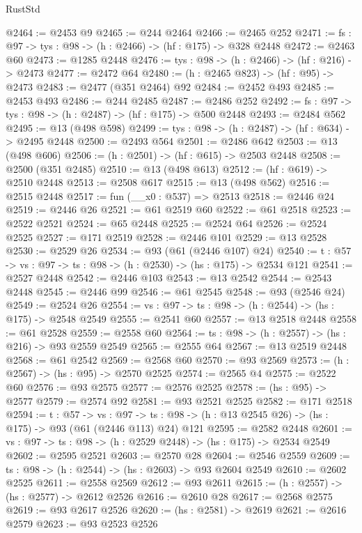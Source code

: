 \begin{lexlean}{RustStd}
\begin{coremodule}
@2464 := @2453 @9
@2465 := @244 @2464
@2466 := @2465 @252
@2471 := {fs : @97} -> {tys : @98} -> (h : @2466) -> (hf : @175) -> @328 @2448
@2472 := @2463 @60
@2473 := @1285 @2448
@2476 := {tys : @98} -> (h : @2466) -> (hf : @216) -> @2473
@2477 := @2472 @64
@2480 := (h : @2465 @823) -> (hf : @95) -> @2473
@2483 := @2477 (@351 @2464) @92
@2484 := @2452 @493
@2485 := @2453 @493
@2486 := @244 @2485
@2487 := @2486 @252
@2492 := {fs : @97} -> {tys : @98} -> (h : @2487) -> (hf : @175) -> @500 @2448
@2493 := @2484 @562
@2495 := @13 (@498 @598)
@2499 := {tys : @98} -> (h : @2487) -> (hf : @634) -> @2495 @2448
@2500 := @2493 @564
@2501 := @2486 @642
@2503 := @13 (@498 @606)
@2506 := (h : @2501) -> (hf : @615) -> @2503 @2448
@2508 := @2500 (@351 @2485)
@2510 := @13 (@498 @613)
@2512 := (hf : @619) -> @2510 @2448
@2513 := @2508 @617
@2515 := @13 (@498 @562)
@2516 := @2515 @2448
@2517 := fun (__x0 : @537) => @2513
@2518 := @2446 @24
@2519 := @2446 @26
@2521 := @61 @2519 @60
@2522 := @61 @2518
@2523 := @2522 @2521
@2524 := @65 @2448
@2525 := @2524 @64
@2526 := @2524 @2525
@2527 := @171 @2519
@2528 := @2446 @101
@2529 := @13 @2528
@2530 := @2529 @26
@2534 := @93 (@61 (@2446 @107) @24)
@2540 := {t : @57} -> {vs : @97} -> {ts : @98} -> (h : @2530) -> (hs : @175) -> @2534 @121
@2541 := @2527 @2448
@2542 := @2446 @103
@2543 := @13 @2542
@2544 := @2543 @2448
@2545 := @2446 @99
@2546 := @61 @2545
@2548 := @93 (@2546 @24)
@2549 := @2524 @26
@2554 := {vs : @97} -> {ts : @98} -> (h : @2544) -> (hs : @175) -> @2548 @2549
@2555 := @2541 @60
@2557 := @13 @2518 @2448
@2558 := @61 @2528
@2559 := @2558 @60
@2564 := {ts : @98} -> (h : @2557) -> (hs : @216) -> @93 @2559 @2549
@2565 := @2555 @64
@2567 := @13 @2519 @2448
@2568 := @61 @2542
@2569 := @2568 @60
@2570 := @93 @2569
@2573 := (h : @2567) -> (hs : @95) -> @2570 @2525
@2574 := @2565 @4
@2575 := @2522 @60
@2576 := @93 @2575
@2577 := @2576 @2525
@2578 := (hs : @95) -> @2577
@2579 := @2574 @92
@2581 := @93 @2521 @2525
@2582 := @171 @2518
@2594 := {t : @57} ->
  {vs : @97} -> {ts : @98} -> (h : @13 @2545 @26) -> (hs : @175) -> @93 (@61 (@2446 @113) @24) @121
@2595 := @2582 @2448
@2601 := {vs : @97} -> {ts : @98} -> (h : @2529 @2448) -> (hs : @175) -> @2534 @2549
@2602 := @2595 @2521
@2603 := @2570 @28
@2604 := @2546 @2559
@2609 := {ts : @98} -> (h : @2544) -> (hs : @2603) -> @93 @2604 @2549
@2610 := @2602 @2525
@2611 := @2558 @2569
@2612 := @93 @2611
@2615 := (h : @2557) -> (hs : @2577) -> @2612 @2526
@2616 := @2610 @28
@2617 := @2568 @2575
@2619 := @93 @2617 @2526
@2620 := (hs : @2581) -> @2619
@2621 := @2616 @2579
@2623 := @93 @2523 @2526

\end{coremodule}
\end{lexlean}
